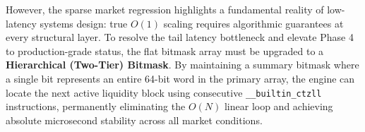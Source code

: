 \documentclass{article}
\begin{document}
However, the sparse market regression highlights a fundamental reality of low-latency systems design: true $O(1)$ scaling requires algorithmic guarantees at every structural layer. To resolve the tail latency bottleneck and elevate Phase 4 to production-grade status, the flat bitmask array must be upgraded to a \textbf{Hierarchical (Two-Tier) Bitmask}. By maintaining a summary bitmask where a single bit represents an entire 64-bit word in the primary array, the engine can locate the next active liquidity block using consecutive \texttt{\_\_builtin\_ctzll} instructions, permanently eliminating the $O(N)$ linear loop and achieving absolute microsecond stability across all market conditions.
\end{document}
